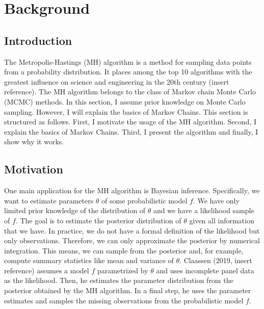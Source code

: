\documentclass[12pt,english,a4paper,oneside]{article}
\theoremstyle{definition}
\theoremstyle{definition}
\theoremstyle{definition}
\theoremstyle{definition}
\theoremstyle{remark}
\begin{document}
\newpage







{
\setcounter{tocdepth}{2}
\newpage
{}
\tableofcontents
}

\newpage
{}
\pagestyle{plain}
\hypertarget{background}{%
\section{Background}\label{background}}

\hypertarget{introduction}{%
\subsection{Introduction}\label{introduction}}

The Metropolis-Hastings (MH) algorithm is a method for sampling data points from a probability distribution. It places among the top 10 algorithms with the greatest influence on science and engineering in the 20th century (insert reference). The MH algorithm belongs to the class of Markov chain Monte Carlo (MCMC) methods. In this section, I assume prior knowledge on Monte Carlo sampling. However, I will explain the basics of Markov Chains. This section is structured as follows. First, I motivate the usage of the MH algorithm. Second, I explain the basics of Markov Chains. Third, I present the algorithm and finally, I show why it works.

\hypertarget{motivation}{%
\subsection{Motivation}\label{motivation}}

One main application for the MH algorithm is Bayesian inference. Specifically, we want to estimate parameters \(\theta\) of some probabilistic model \(f\). We have only limited prior knowledge of the distribution of \(\theta\) and we have a likelihood sample of \(f\). The goal is to estimate the posterior distribution of \(\theta\) given all information that we have. In practice, we do not have a formal definition of the likelihood but only observations. Therefore, we can only approximate the posterior by numerical integration. This means, we can sample from the posterior and, for example, compute summary statistics like mean and variance of \(\theta\). Claassen (2019, insert reference) assumes a model \(f\) parametrized by \(\theta\) and uses incomplete panel data as the likelihood. Then, he estimates the parameter distribution from the posterior obtained by the MH algorithm. In a final step, he uses the parameter estimates and samples the missing observations from the probabilistic model \(f\).
\end{document}
